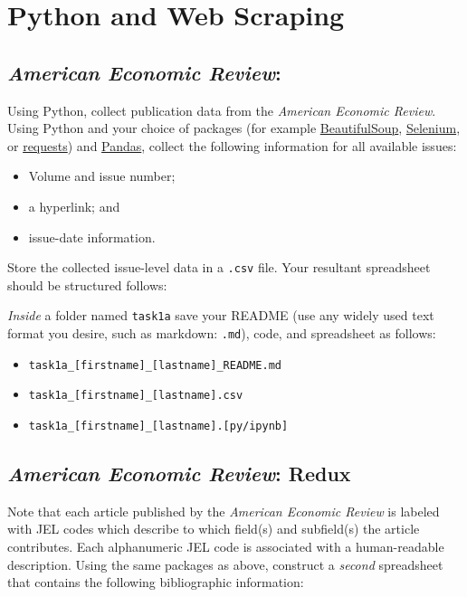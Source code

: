\documentclass[11pt, letterpaper, twoside]{article}
\begin{document}
\newpage

\section{Python and Web Scraping}

\subsection{\textit{American Economic Review}:}
Using Python, collect publication data from the \textit{American Economic Review}. Using Python and your choice of packages (for example \href{https://www.crummy.com/software/BeautifulSoup/bs4/doc/}{BeautifulSoup}, \href{https://selenium-python.readthedocs.io/}{Selenium}, or \href{https://requests.readthedocs.io/en/latest/}{requests}) and \href{https://pandas.pydata.org/docs/}{Pandas}, collect the following information for all available issues:


\begin{itemize}
    \item Volume and issue number;
    \item a hyperlink; and
    \item issue-date information.
\end{itemize}   


Store the collected issue-level data in a \verb|.csv| file. Your resultant spreadsheet should be structured follows:



\textit{Inside} a folder named \verb|task1a| save your README (use any widely used text format you desire, such as markdown: \verb|.md|), code, and spreadsheet as follows:
\begin{itemize}
    \item \verb|task1a_[firstname]_[lastname]_README.md|
    \item \verb|task1a_[firstname]_[lastname].csv|
    \item \verb|task1a_[firstname]_[lastname].[py/ipynb]|
\end{itemize}

\subsection{\textit{American Economic Review}: Redux}
Note that each article published by the \textit{American Economic Review} is labeled with JEL codes which describe to which field(s) and subfield(s) the article contributes. Each alphanumeric JEL code is associated with a human-readable description. Using the same packages as above, construct a \textit{second} spreadsheet that contains the following bibliographic information:
\end{document}
